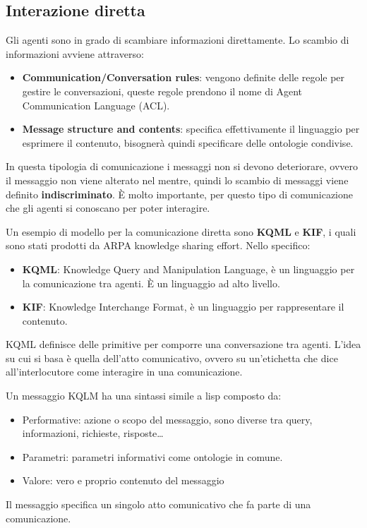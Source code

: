 \subsection{Interazione diretta}
Gli agenti sono in grado di scambiare informazioni direttamente. Lo scambio di
informazioni avviene attraverso:
\begin{itemize}
    \item \textbf{Communication/Conversation rules}: vengono definite delle
          regole per gestire le conversazioni, queste regole prendono il nome di
          Agent Communication Language (ACL).
    \item \textbf{Message structure and contents}: specifica effettivamente il
          linguaggio per esprimere il contenuto, bisognerà quindi specificare
          delle ontologie condivise.
\end{itemize}
In questa tipologia di comunicazione i messaggi non si devono deteriorare, ovvero
il messaggio non viene alterato nel mentre, quindi lo scambio di messaggi viene
definito \textbf{indiscriminato}. È molto importante, per questo tipo di
comunicazione che gli agenti si conoscano per poter interagire.
\begin{esempio}
    Un esempio di modello per la comunicazione diretta sono \textbf{KQML} e
    \textbf{KIF}, i quali sono stati prodotti da ARPA knowledge sharing effort.
    Nello specifico:
    \begin{itemize}
        \item \textbf{KQML}: Knowledge Query and Manipulation Language, è un
              linguaggio per la comunicazione tra agenti. È un linguaggio ad
              alto livello.
        \item \textbf{KIF}: Knowledge Interchange Format, è un linguaggio per
              rappresentare il contenuto.
    \end{itemize}

    KQML definisce delle primitive per comporre una conversazione tra agenti.
    L'idea su cui si basa è quella dell'atto comunicativo, ovvero su un'etichetta
    che dice all'interlocutore come interagire in una comunicazione.

    Un messaggio KQLM ha una sintassi simile a lisp composto da:
    \begin{itemize}
        \item Performative: azione o scopo del messaggio, sono diverse tra query,
              informazioni, richieste, risposte\dots
        \item Parametri: parametri informativi come ontologie in comune.
        \item Valore: vero e proprio contenuto del messaggio
    \end{itemize}
    Il messaggio specifica un singolo atto comunicativo che fa parte di una comunicazione.
\end{esempio}

